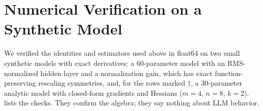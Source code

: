 \documentclass[11pt]{article}
\begin{document}
\section{Numerical Verification on a Synthetic Model}
\label{app:numerical}

We verified the identities and estimators used above in float64 on two small synthetic models with exact derivatives: a 60-parameter model with an RMS-normalized hidden layer and a normalization gain, which has exact function-preserving rescaling symmetries, and, for the rows marked $\dagger$, a 30-parameter analytic model with closed-form gradients and Hessians ($m=4$, $n=8$, $k=2$).  lists the checks. They confirm the algebra; they say nothing about LLM behavior.
\end{document}
